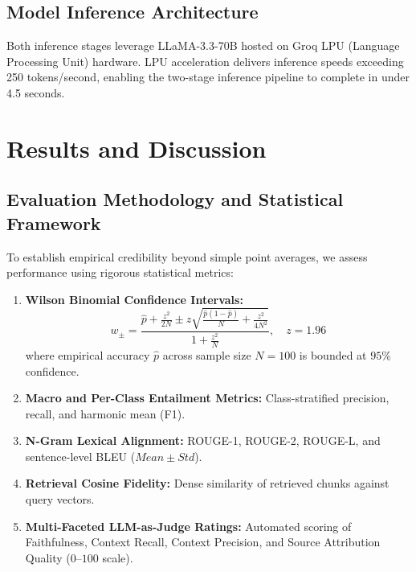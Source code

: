 \documentclass[conference]{IEEEtran}
\begin{document}
\subsection{Model Inference Architecture}
Both inference stages leverage LLaMA-3.3-70B hosted on Groq LPU (Language Processing Unit) hardware. LPU acceleration delivers inference speeds exceeding 250 tokens/second, enabling the two-stage inference pipeline to complete in under 4.5 seconds.

\section{Results and Discussion}
\label{sec:results}

\subsection{Evaluation Methodology and Statistical Framework}
To establish empirical credibility beyond simple point averages, we assess performance using rigorous statistical metrics:
\begin{enumerate}
    \item \textbf{Wilson Binomial Confidence Intervals:}
    \begin{equation}
    w_{\pm} = \frac{\hat{p} + \frac{z^2}{2N} \pm z\sqrt{\frac{\hat{p}(1-\hat{p})}{N} + \frac{z^2}{4N^2}}}{1 + \frac{z^2}{N}}, \quad z=1.96
    \end{equation}
    where empirical accuracy $\hat{p}$ across sample size $N=100$ is bounded at $95\%$ confidence.
    \item \textbf{Macro and Per-Class Entailment Metrics:} Class-stratified precision, recall, and harmonic mean (F1).
    \item \textbf{N-Gram Lexical Alignment:} ROUGE-1, ROUGE-2, ROUGE-L, and sentence-level BLEU ($Mean \pm Std$).
    \item \textbf{Retrieval Cosine Fidelity:} Dense similarity of retrieved chunks against query vectors.
    \item \textbf{Multi-Faceted LLM-as-Judge Ratings:} Automated scoring of Faithfulness, Context Recall, Context Precision, and Source Attribution Quality ($0$--$100$ scale).
\end{enumerate}
\end{document}
